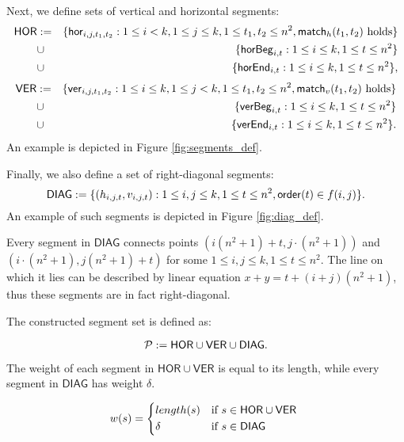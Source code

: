 \newcommand{\allhor}{\mathsf{HOR}}
\newcommand{\allver}{\mathsf{VER}}
\newcommand{\alldiag}{\mathsf{DIAG}}

Next, we define sets of vertical and horizontal segments:
\begin{eqnarray*}
\allhor &:= &\{\hor{i}{j}{t_1}{t_2} : 1 \le i < k, 1 \le j \le k,
1 \le t_1, t_2 \le n^2, \matchh(t_1, t_2) \text{ holds}\} \\
&\cup &\{\horbeg{i}{t} : 1 \le i \le k, 1 \le t \le n^2\}
\\
&\cup &\{\horend{i}{t} : 1 \le i \le k, 1 \le t \le n^2\},
\end{eqnarray*}
\begin{eqnarray*}
\allver &:= &\{\ver{i}{j}{t_1}{t_2} : 1 \le i \le k, 1 \le j < k,
1 \le t_1, t_2 \le n^2, \matchv(t_1, t_2) \text{ holds}\} \\
&\cup &\{\verbeg{i}{t} : 1 \le i \le k, 1 \le t \le n^2\}
\\
&\cup &\{\verend{i}{t} : 1 \le i \le k, 1 \le t \le n^2\}.
\end{eqnarray*}
An example is depicted in Figure \ref{fig:segments_def}.

Finally, we also define a set of right-diagonal segments:
$$\alldiag := \{ (h_{i, j, t}, v_{i, j, t}) :
	1 \le i, j \le k, 1 \le t \le n^2, \order(t) \in f(i, j)\}.$$
An example of such segments is depicted in Figure \ref{fig:diag_def}.



Every segment in $\alldiag$
connects points $(i(n^2+1) + t, j \cdot (n^2+1))$
and ${(i \cdot (n^2+1), j(n^2+1) + t)}$
for some $1 \le i,j \le k, 1 \le t \le n^2$.
The line on which it lies can be described
by linear equation ${x+y=t+(i+j)(n^2+1)}$,
thus these segments are in fact right-diagonal.

The constructed segment set is defined as:

$$\sets := \allhor \cup \allver \cup \alldiag.$$

The weight of each segment in $\allhor \cup \allver$
is equal to its length,
while every segment in $\alldiag$ has weight
$\delta$.



\begin{equation}
w(s) =
	\begin{cases*}
	  length(s) 			& if $s \in \allhor \cup \allver$ \\
	  \delta        & if $s \in \alldiag$
	\end{cases*}
\end{equation}

